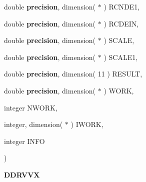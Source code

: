 {\begin{DoxyParamCaption}
\item[{double {\bf precision}, dimension( $\ast$ )}]{R\+C\+N\+D\+E1, }
\item[{double {\bf precision}, dimension( $\ast$ )}]{R\+C\+D\+E\+I\+N, }
\item[{double {\bf precision}, dimension( $\ast$ )}]{S\+C\+A\+L\+E, }
\item[{double {\bf precision}, dimension( $\ast$ )}]{S\+C\+A\+L\+E1, }
\item[{double {\bf precision}, dimension( 11 )}]{R\+E\+S\+U\+L\+T, }
\item[{double {\bf precision}, dimension( $\ast$ )}]{W\+O\+R\+K, }
\item[{integer}]{N\+W\+O\+R\+K, }
\item[{integer, dimension( $\ast$ )}]{I\+W\+O\+R\+K, }
\item[{integer}]{I\+N\+F\+O}
\end{DoxyParamCaption}
)}\label{group__double__eig_ga4db8108d75a2a49d865e766418fa0726}


{\bfseries D\+D\+R\+V\+V\+X} 

